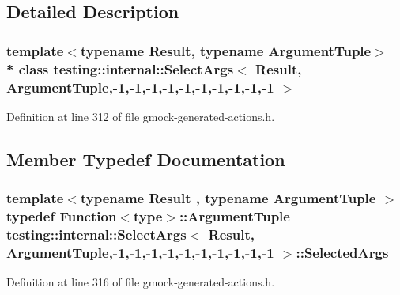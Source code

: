 \subsection{Detailed Description}
\subsubsection*{template$<$typename Result, typename Argument\+Tuple$>$\\*
class testing\+::internal\+::\+Select\+Args$<$ Result, Argument\+Tuple,-\/1,-\/1,-\/1,-\/1,-\/1,-\/1,-\/1,-\/1,-\/1,-\/1 $>$}



Definition at line 312 of file gmock-\/generated-\/actions.\+h.



\subsection{Member Typedef Documentation}
\subsubsection[{\texorpdfstring{Selected\+Args}{SelectedArgs}}]{\setlength{\rightskip}{0pt plus 5cm}template$<$typename Result , typename Argument\+Tuple $>$ typedef {\bf Function}$<${\bf type}$>$\+::{\bf Argument\+Tuple} {\bf testing\+::internal\+::\+Select\+Args}$<$ {\bf Result}, {\bf Argument\+Tuple},-\/1,-\/1,-\/1,-\/1,-\/1,-\/1,-\/1,-\/1,-\/1,-\/1 $>$\+::{\bf Selected\+Args}}\hypertarget{classtesting_1_1internal_1_1_select_args_3_01_result_00_01_argument_tuple_00-1_00-1_00-1_00-1_005f626e5adb9246c46f665dbb755b50f6_adc60d51fe96e09fd5e41b2a61f998c54}{}\label{classtesting_1_1internal_1_1_select_args_3_01_result_00_01_argument_tuple_00-1_00-1_00-1_00-1_005f626e5adb9246c46f665dbb755b50f6_adc60d51fe96e09fd5e41b2a61f998c54}


Definition at line 316 of file gmock-\/generated-\/actions.\+h.

